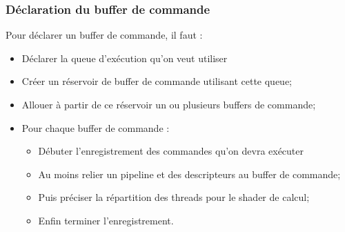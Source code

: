 \documentclass{beamer}
\begin{document}
\begin{frame}[fragile]
\frametitle{Déclaration du buffer de commande}
\begin{center}
\end{center}

Pour déclarer un buffer de commande, il faut :
\begin{itemize}
\small
\item Déclarer la queue d'exécution qu'on veut utiliser
\item Créer un réservoir de buffer de commande utilisant cette queue;
\item Allouer à partir de ce réservoir un ou plusieurs buffers de commande;
\item Pour chaque buffer de commande :
\begin{itemize}
\small
\item Débuter l'enregistrement des commandes qu'on devra exécuter
\item Au moins relier un pipeline et des descripteurs au buffer de commande;
\item Puis préciser la répartition des threads pour le shader de calcul;
\item Enfin terminer l'enregistrement.
\end{itemize}
\end{itemize}
\end{frame}
\end{document}
